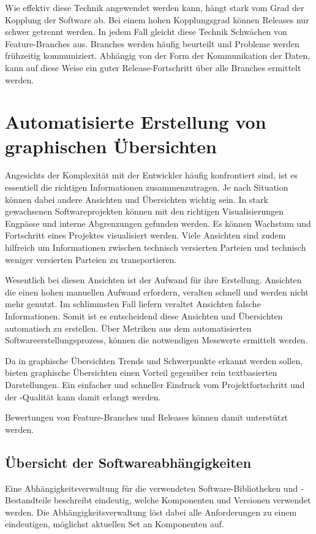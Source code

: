 Wie effektiv diese Technik angewendet werden kann, hängt stark vom Grad der Kopplung der Software ab. Bei einem hohen Kopplungsgrad können Releases nur schwer getrennt werden. In jedem Fall gleicht diese Technik Schwächen von Feature-Branches aus. Branches werden häufig beurteilt und Probleme werden frühzeitig kommuniziert. Abhängig von der Form der Kommunikation der Daten, kann auf diese Weise ein guter Release-Fortschritt über alle Branches ermittelt werden. 

\section{Automatisierte Erstellung von graphischen Übersichten}

Angesichts der Komplexität mit der Entwickler häufig konfrontiert sind, ist es essentiell die richtigen Informationen zusammenzutragen. Je nach Situation können dabei andere Ansichten und Übersichten wichtig sein. In stark gewachsenen Softwareprojekten können mit den richtigen Visualisierungen Engpässe und interne Abgrenzungen gefunden werden. Es können Wachstum und Fortschritt eines Projektes visualisiert werden. Viele Ansichten sind zudem hilfreich um Informationen zwischen technisch versierten Parteien und technisch weniger versierten Parteien zu transportieren.

Wesentlich bei diesen Ansichten ist der Aufwand für ihre Erstellung. Ansichten die einen hohen manuellen Aufwand erfordern, veralten schnell und werden nicht mehr genutzt. Im schlimmsten Fall liefern veraltet Ansichten falsche Informationen. Somit ist es entscheidend diese Ansichten und Übersichten automatisch zu erstellen. Über Metriken aus dem automatisierten Softwareerstellungsprozess, können die notwendigen Messwerte ermittelt werden. 

Da in graphische Übersichten Trends und Schwerpunkte erkannt werden sollen, bieten graphische Übersichten einen Vorteil gegenüber rein textbasierten Darstellungen. Ein einfacher und schneller Eindruck vom Projektfortschritt und der -Qualität kann damit erlangt werden.

Bewertungen von Feature-Branches und Releases können damit unterstützt werden.

\subsection{Übersicht der Softwareabhängigkeiten} 

Eine Abhängigkeitsverwaltung für die verwendeten Software-Bibliotheken und -Bestandteile beschreibt eindeutig, welche Komponenten und Versionen verwendet werden. Die Abhängigkeitsverwaltung löst dabei alle Anforderungen zu einem eindeutigen, möglichst aktuellen Set an Komponenten auf.

